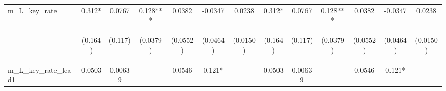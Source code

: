\documentclass[]{article}
\begin{document}
\begin{center}
\begin{tabular}{lcccccccccccc}
m\_L\_key\_rate & 0.312* & 0.0767 & 0.128*** & 0.0382 & -0.0347 & 0.0238 & 0.312* & 0.0767 & 0.128*** & 0.0382 & -0.0347 & 0.0238 \\
\vspace{4pt} & \begin{footnotesize}(0.164)\end{footnotesize} & \begin{footnotesize}(0.117)\end{footnotesize} & \begin{footnotesize}(0.0379)\end{footnotesize} & \begin{footnotesize}(0.0552)\end{footnotesize} & \begin{footnotesize}(0.0464)\end{footnotesize} & \begin{footnotesize}(0.0150)\end{footnotesize} & \begin{footnotesize}(0.164)\end{footnotesize} & \begin{footnotesize}(0.117)\end{footnotesize} & \begin{footnotesize}(0.0379)\end{footnotesize} & \begin{footnotesize}(0.0552)\end{footnotesize} & \begin{footnotesize}(0.0464)\end{footnotesize} & \begin{footnotesize}(0.0150)\end{footnotesize} \\
m\_L\_key\_rate\_lead1 & 0.0503 & 0.00639 &  & 0.0546 & 0.121* &  & 0.0503 & 0.00639 &  & 0.0546 & 0.121* &  \\

\end{tabular}
\end{center}
\end{document}

